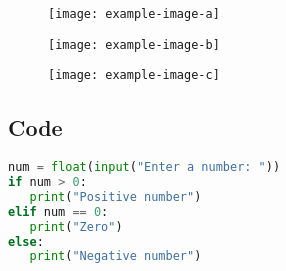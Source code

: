 \begin{figure}[H]
	\centering
	\begin{minipage}{0.3\textwidth}
		\centering
		\texttt{[image: example-image-a]}
		\label{fig: style 2 image a}
	\end{minipage}
	\hfill
	\begin{minipage}{0.3\textwidth}
		\centering
		\texttt{[image: example-image-b]}
		\label{fig: style 2 image b}
	\end{minipage}
	\hfill
	\begin{minipage}{0.3\textwidth}
		\centering
		\texttt{[image: example-image-c]}
		\label{fig: style 2 image c}
	\end{minipage}
\end{figure}
\newpage

\subsection{Code}

\begin{lstlisting}[language=python]
num = float(input("Enter a number: "))
if num > 0:
   print("Positive number")
elif num == 0:
   print("Zero")
else:
   print("Negative number")
\end{lstlisting}
